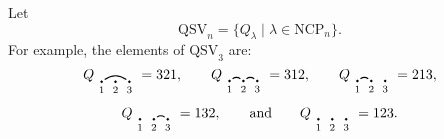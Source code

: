 \documentclass[submission]{FPSAC2024}
\newtheorem{lem}[equation]{Lemma}
\theoremstyle{definition}
\theoremstyle{remark}
\numberwithin{equation}{section}
\renewcommand{\setminus}{-}
\newcommand{\QSV}{\mathrm{QSV}}
\newcommand{\NCP}{\mathrm{NCP}}
\begin{document}
Let
\[
\QSV_{n} = \{Q_{\lambda} \;|\; \lambda \in \NCP_{n} \}.
\]
For example, the elements of $\QSV_{3}$ are:
\[
Q_{\begin{tikzpicture}[scale = 0.35, baseline = 0.35*-0.2]
\foreach \x in {1, ..., 3}{\draw[fill] (\x - 1, 0) circle (2pt) node[inner sep = 2pt] (\x) {};}
\foreach \x in {1, ..., 3}{\node[below] at (\x) {$\scriptstyle \x$};}
\foreach \i\j in {1/3}{\draw[thick] (\i) to[out = 35, in = 145] (\j);}
\end{tikzpicture}} = 321, \qquad
Q_{\begin{tikzpicture}[scale = 0.35, baseline = 0.35*-0.2]
\foreach \x in {1, ..., 3}{\draw[fill] (\x - 1, 0) circle (2pt) node[inner sep = 2pt] (\x) {};}
\foreach \x in {1, ..., 3}{\node[below] at (\x) {$\scriptstyle \x$};}
\foreach \i\j in {1/2, 2/3}{\draw[thick] (\i) to[out = 35, in = 145] (\j);}
\end{tikzpicture}} = 312, \qquad
Q_{\begin{tikzpicture}[scale = 0.35, baseline = 0.35*-0.2]
\foreach \x in {1, ..., 3}{\draw[fill] (\x - 1, 0) circle (2pt) node[inner sep = 2pt] (\x) {};}
\foreach \x in {1, ..., 3}{\node[below] at (\x) {$\scriptstyle \x$};}
\foreach \i\j in {1/2}{\draw[thick] (\i) to[out = 35, in = 145] (\j);}
\end{tikzpicture}} = 213, 
\]
\[
Q_{\begin{tikzpicture}[scale = 0.35, baseline = 0.35*-0.2]
\foreach \x in {1, ..., 3}{\draw[fill] (\x - 1, 0) circle (2pt) node[inner sep = 2pt] (\x) {};}
\foreach \x in {1, ..., 3}{\node[below] at (\x) {$\scriptstyle \x$};}
\foreach \i\j in {2/3}{\draw[thick] (\i) to[out = 35, in = 145] (\j);}
\end{tikzpicture}} = 132, \qquad\text{and}\qquad
Q_{\begin{tikzpicture}[scale = 0.35, baseline = 0.35*-0.2]
\foreach \x in {1, ..., 3}{\draw[fill] (\x - 1, 0) circle (2pt) node[inner sep = 2pt] (\x) {};}
\foreach \x in {1, ..., 3}{\node[below] at (\x) {$\scriptstyle \x$};}
\end{tikzpicture}} = 123.
\]

%
\end{document}
